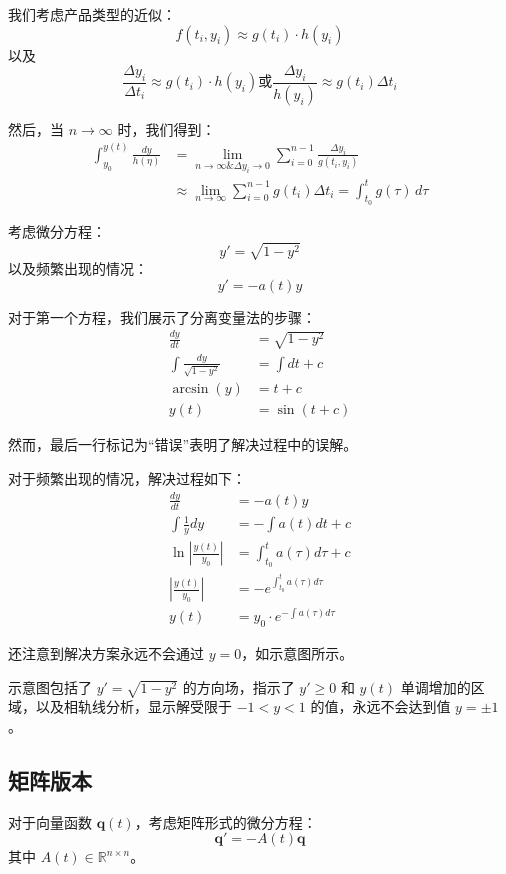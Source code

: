 \documentclass{ctexart}
\begin{document}
我们考虑产品类型的近似：
\[ f(t_i,y_i) \approx g(t_i) \cdot h(y_i) \]
以及
\[ \frac{\Delta y_i}{\Delta t_i} \approx g(t_i) \cdot h(y_i) 或 \frac{\Delta y_i}{h(y_i)} \approx g(t_i) \Delta t_i\]

然后，当 \( n \rightarrow \infty \) 时，我们得到：
\begin{align*}
\int_{y_0}^{y(t)} \frac{dy}{h(\eta)} &= \lim_{n \rightarrow \infty \& \Delta y_i \rightarrow 0} \sum_{i=0}^{n-1} \frac{\Delta y_i}{g(t_i,y_i)} \\
&\approx \lim_{n \rightarrow \infty} \sum_{i=0}^{n-1} g(t_i) \Delta t_i = \int_{t_0}^{t} g(\tau) \, d\tau
\end{align*}


考虑微分方程：
\[ y' = \sqrt{1 - y^2} \]
以及频繁出现的情况：
\[ y' = -a(t)y \]

对于第一个方程，我们展示了分离变量法的步骤：
\begin{align*}
\frac{dy}{dt} &= \sqrt{1 - y^2} \\
\int \frac{dy}{\sqrt{1 - y^2}} &= \int dt + c \\
\arcsin(y) &= t + c \\
y(t) &= \sin(t + c)
\end{align*}

然而，最后一行标记为“错误”表明了解决过程中的误解。

对于频繁出现的情况，解决过程如下：
\begin{align*}
\frac{dy}{dt} &= -a(t)y \\
\int \frac{1}{y} dy &= -\int a(t) dt + c \\
\ln |\frac{y(t)}{y_0}| &=  \int_{t_0}^{t} a(\tau) d\tau + c \\
|\frac{y(t)}{y_0}| &= - e^{\int_{t_0}^{t} a(\tau) d\tau}\\
y(t) &= y_0\cdot e^{-\int a(\tau) d\tau}
\end{align*}

还注意到解决方案永远不会通过 \( y = 0 \)，如示意图所示。


示意图包括了 \( y' = \sqrt{1 - y^2} \) 的方向场，指示了 \( y' \geq 0 \) 和 \( y(t) \) 单调增加的区域，以及相轨线分析，显示解受限于 \( -1 < y < 1 \) 的值，永远不会达到值 \( y = \pm 1 \)。


\subsection*{矩阵版本}

对于向量函数 \(\mathbf{q}(t)\)，考虑矩阵形式的微分方程：
\[ \mathbf{q}' = -A(t) \mathbf{q} \]
其中 \( A(t) \in \mathbb{R}^{n \times n} \)。
\end{document}

